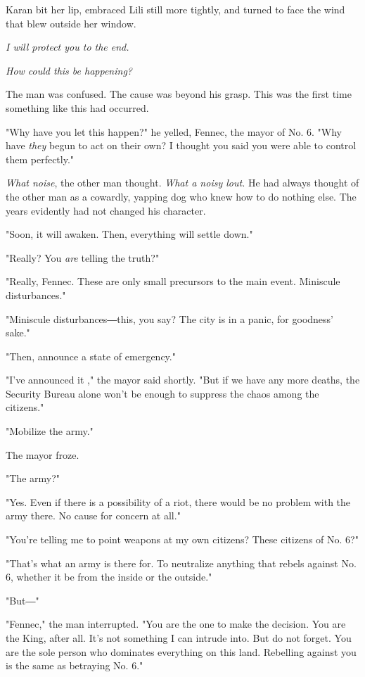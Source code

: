 Karan bit her lip, embraced Lili still more tightly, and turned to face
the wind that blew outside her window.

\emph{I will protect you to the end.}

\mybreak

\emph{How could this be happening?}

The man was confused. The cause was beyond his grasp. This was the first
time something like this had occurred.

"Why have you let this happen?" he yelled, Fennec, the mayor of No. 6.
"Why have \emph{they} begun to act on their own? I thought you said you were
able to control them perfectly."

\emph{What noise}, the other man thought. \emph{What a noisy lout.} He had always
thought of the other man as a cowardly, yapping dog who knew how to do
nothing else. The years evidently had not changed his character.

"Soon, it will awaken. Then, everything will settle down."

"Really? You \emph{are} telling the truth?"

"Really, Fennec. These are only small precursors to the main event.
Miniscule disturbances."

"Miniscule disturbances―this, you say? The city is in a panic, for
goodness' sake."

"Then, announce a state of emergency."

"I've announced it ," the mayor said shortly. "But if we have any more
deaths, the Security Bureau alone won't be enough to suppress the chaos
among the citizens."

"Mobilize the army."

The mayor froze.

"The army?"

"Yes. Even if there is a possibility of a riot, there would be no
problem with the army there. No cause for concern at all."

"You're telling me to point weapons at my own citizens? These citizens
of No. 6?"

"That's what an army is there for. To neutralize anything that rebels
against No. 6, whether it be from the inside or the outside."

"But―"

"Fennec," the man interrupted. "You are the one to make the decision.
You are the King, after all. It's not something I can intrude into. But
do not forget. You are the sole person who dominates everything on this
land. Rebelling against you is the same as betraying No. 6."

